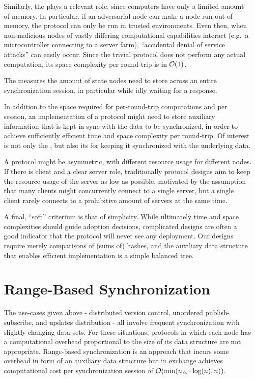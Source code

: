 Similarly, the  plays a relevant
role, since computers have only a limited amount of memory. In
particular, if an adversarial node can make a node run out of memory,
the protocol can only be run in trusted environments. Even then, when
non-malicious nodes of vastly differing computational capabilities
interact (e.g.~a microcontroller connecting to a server farm),
``accidental denial of service attacks'' can easily occur. Since the
trivial protocol does not perform any actual computation, its space
complexity per round-trip is in $\mathcal{O}(1)$.

The  measures the amount of state
nodes need to store across an entire synchronization session, in particular
while idly waiting for a response.

In addition to the space required for per-round-trip computations and per session, an
implementation of a protocol might need to store auxiliary information
that is kept in sync with the data to be synchronized, in order to
achieve sufficiently efficient time and space complexity per round-trip.
Of interest is not only the , but also its  for keeping it
synchronized with the underlying data.

A protocol might be asymmetric, with different resource usage for different nodes.
If there is client and a clear server role, traditionally protocol designs aim to
keep the resource usage of the server as low as possible, motivated by the assumption
that many clients might concurrently connect to a single server, but a single client rarely
connects to a prohibitive amount of servers at the same time.

A final, ``soft'' criterium is that of simplicity. While ultimately time
and space complexities should guide adoption decisions, complicated
designs are often a good indicator that the protocol will never see any
deployment. Our designs require merely comparisons of (sums of) hashes,
and the auxiliary data structure that enables efficient implementation
is a simple balanced tree.

\section{Range-Based Synchronization}
\label{recursively-comparing-fingerprints}

The use-cases given above - distributed version control, unordered publish-subscribe, and updates distribution - all involve frequent synchronization with slightly changing data sets. For these situations, protocols in which each node has a computational overhead proportional to the size of its data structure are not appropriate. Range-based synchronization is an approach that incurs some overhead in form of an auxiliary data structure but in exchange achieves computational cost per synchronization session  of $\mathcal{O}(\min(n_{\triangle} \cdot \log(n), n))$.

